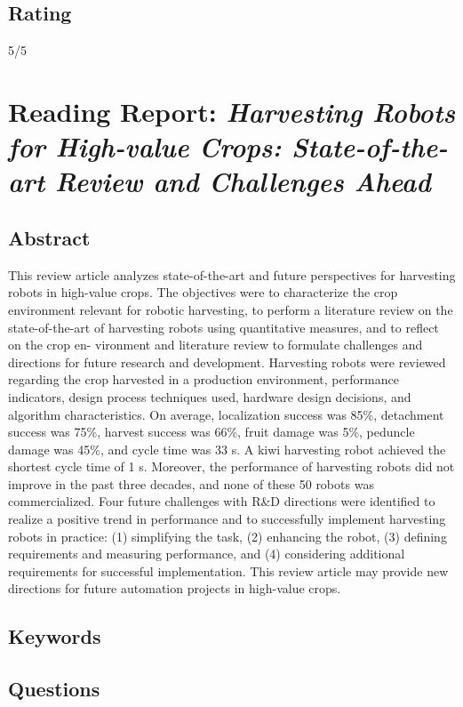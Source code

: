 \subsection*{Rating}
5/5


\section{Reading Report: \emph{Harvesting Robots for High-value Crops: State-of-the-art Review and Challenges Ahead}}
\cite{Bac2014}

\subsection*{Abstract}
This review article analyzes state-of-the-art and future perspectives for harvesting robots in high-value crops.
The objectives were to characterize the crop environment relevant for robotic harvesting, to perform a literature
review on the state-of-the-art of harvesting robots using quantitative measures, and to reflect on the crop en-
vironment and literature review to formulate challenges and directions for future research and development.
Harvesting robots were reviewed regarding the crop harvested in a production environment, performance indicators, design process techniques used, hardware design decisions, and algorithm characteristics. On average,
localization success was 85\%, detachment success was 75\%, harvest success was 66\%, fruit damage was 5\%,
peduncle damage was 45\%, and cycle time was 33 s. A kiwi harvesting robot achieved the shortest cycle time
of 1 s. Moreover, the performance of harvesting robots did not improve in the past three decades, and none
of these 50 robots was commercialized. Four future challenges with R\&D directions were identified to realize
a positive trend in performance and to successfully implement harvesting robots in practice: (1) simplifying
the task, (2) enhancing the robot, (3) defining requirements and measuring performance, and (4) considering
additional requirements for successful implementation. This review article may provide new directions for
future automation projects in high-value crops.
\subsection*{Keywords}

\subsection*{Questions}
